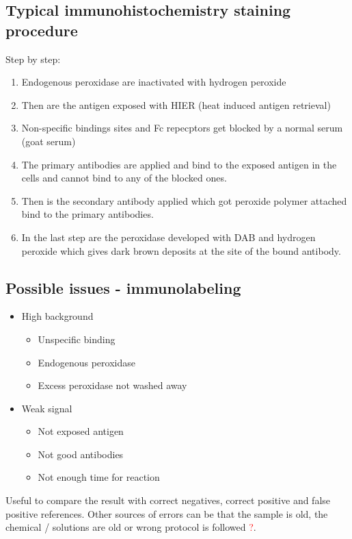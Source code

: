 	\subsection{Typical immunohistochemistry staining procedure}
	Step by step:
	\begin{enumerate}
		\item Endogenous peroxidase are inactivated with hydrogen peroxide
		\item Then are the antigen exposed with HIER (heat induced antigen retrieval)
		\item Non-specific bindings sites and Fc repecptors get blocked by a normal serum (goat serum)
		\item The primary antibodies are applied and bind to the exposed antigen in the cells and cannot bind to any of the blocked ones. 
		\item Then is the secondary antibody applied which got peroxide polymer attached bind to the primary antibodies. 
		\item In the last step are the peroxidase developed with DAB and hydrogen peroxide which gives dark brown deposits at the site of the bound antibody.
	\end{enumerate}

	\subsection{Possible issues - immunolabeling}
	
	\begin{itemize}
		\item High background
		\begin{itemize}
			\item Unspecific binding
			\item Endogenous peroxidase
			\item Excess peroxidase not washed away
		\end{itemize}
		\item Weak signal
		\begin{itemize}
			\item Not exposed antigen
			\item Not good antibodies
			\item Not enough time for reaction
		\end{itemize}
	\end{itemize}
	
	Useful to compare the result with correct negatives, correct positive and false positive references. Other sources of errors can be that the sample is old, the chemical / solutions are old or wrong protocol is followed \textcolor{red}{?}. 

